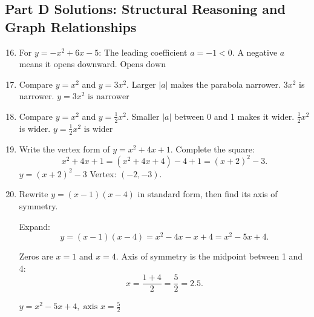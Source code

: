 \documentclass[14pt]{extarticle}
\begin{document}
\subsection*{Part D Solutions: Structural Reasoning and Graph Relationships}
\begin{enumerate}
  \setcounter{enumi}{15}
  \item For \(y = -x^2 + 6x - 5\):  
  The leading coefficient \(a = -1 < 0\).  
  A negative \(a\) means it opens downward.  
  \(\boxed{\text{Opens down}}\)

  \item Compare \(y = x^2\) and \(y = 3x^2\).  
  Larger \(|a|\) makes the parabola narrower.  
  \(3x^2\) is narrower.  
  \(\boxed{y = 3x^2 \text{ is narrower}}\)

  \item Compare \(y = x^2\) and \(y = \tfrac{1}{2}x^2\).  
  Smaller \(|a|\) between 0 and 1 makes it wider.  
  \(\tfrac{1}{2}x^2\) is wider.  
  \(\boxed{y = \tfrac{1}{2}x^2 \text{ is wider}}\)

  \item Write the vertex form of \(y = x^2 + 4x + 1\).  
  Complete the square:  
  \[
  x^2 + 4x + 1 = (x^2 + 4x + 4) - 4 + 1 = (x + 2)^2 - 3.
  \]
  \(\boxed{y = (x + 2)^2 - 3}\)  
  Vertex: \((-2, -3)\).

  \item Rewrite \(y = (x - 1)(x - 4)\) in standard form, then find its axis of symmetry.

  Expand:  
  \[
  y = (x - 1)(x - 4) = x^2 - 4x - x + 4 = x^2 - 5x + 4.
  \]

  Zeros are \(x = 1\) and \(x = 4\).  
  Axis of symmetry is the midpoint between 1 and 4:  
  \[
  x = \frac{1 + 4}{2} = \frac{5}{2} = 2.5.
  \]

  \(\boxed{y = x^2 - 5x + 4,\; \text{axis } x = \frac{5}{2}}\)
\end{enumerate}
\end{document}
